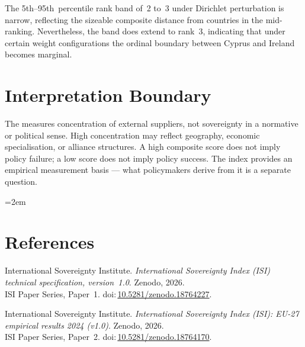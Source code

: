 \documentclass[12pt,a4paper]{article}
\begin{document}
The 5th--95th~percentile rank band of~2 to~3 under Dirichlet perturbation is narrow, reflecting the sizeable composite distance from countries in the mid-ranking.  Nevertheless, the band does extend to rank~3, indicating that under certain weight configurations the ordinal boundary between Cyprus and Ireland becomes marginal.


\section{Interpretation Boundary}
\label{sec:interpretation}

The \ISI measures concentration of external suppliers, not sovereignty in a normative or political sense.  High concentration may reflect geography, economic specialisation, or alliance structures.  A high composite score does not imply policy failure; a low score does not imply policy success.  The index provides an empirical measurement basis --- what policymakers derive from it is a separate question.


\clearpage
\vspace*{1.5cm}

\begingroup\emergencystretch=2em
\section*{References}

\begin{enumerate}[label={[\arabic*]},leftmargin=2em,itemsep=6pt]
\item International Sovereignty Institute.
  \textit{International Sovereignty Index (ISI) technical specification, version~1.0}.
  Zenodo, 2026.\\ISI Paper Series, Paper~1.
  doi:\,\href{https://doi.org/10.5281/zenodo.18764227}{10.5281/zenodo.18764227}.

\item International Sovereignty Institute.
  \textit{International Sovereignty Index (ISI): EU-27 empirical results 2024 (v1.0)}.
  Zenodo, 2026.\\ISI Paper Series, Paper~2.
  doi:\,\href{https://doi.org/10.5281/zenodo.18764170}{10.5281/zenodo.18764170}.
\end{enumerate}
\endgroup
\end{document}
